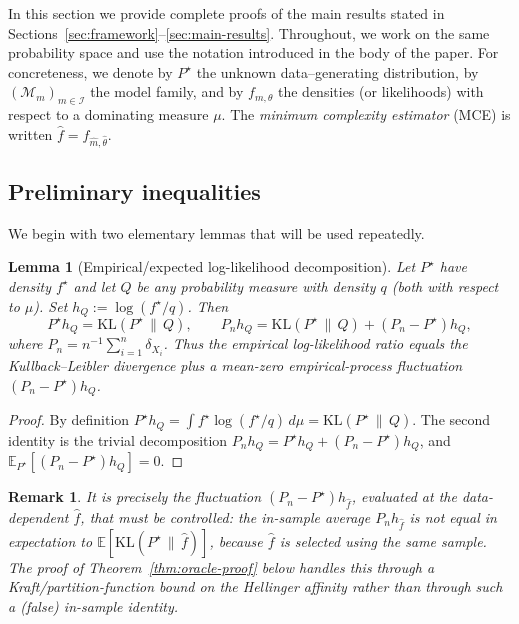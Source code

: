 \documentclass[12pt]{article}
\newtheorem{lemma}[theorem]{Lemma}
\newtheorem{remark}[theorem]{Remark}
\numberwithin{equation}{section}
\begin{document}
	In this section we provide complete proofs of the main results stated in
	Sections~\ref{sec:framework}--\ref{sec:main-results}.  Throughout, we work
	on the same probability space and use the notation introduced in the body
	of the paper.  For concreteness, we denote by $P^{\star}$ the unknown
	data--generating distribution, by $(\mathcal{M}_m)_{m\in\mathcal{I}}$ the
	model family, and by $f_{m,\theta}$ the densities (or likelihoods) with
	respect to a dominating measure $\mu$.  The \emph{minimum complexity
		estimator} (MCE) is written $\widehat{f} = f_{\widehat{m},\widehat{\theta}}$.
	
	\subsection{Preliminary inequalities}
	
	We begin with two elementary lemmas that will be used repeatedly.
	
	\begin{lemma}[Empirical/expected log-likelihood decomposition]
		\label{lem:KL-decomp}
		Let $P^{\star}$ have density $f^{\star}$ and let $Q$ be any probability
		measure with density $q$ (both with respect to $\mu$). Set
		$h_Q:=\log(f^{\star}/q)$. Then
		\begin{equation}
			P^{\star} h_Q = \mathrm{KL}(P^{\star}\,\|\,Q),
			\qquad
			P_n h_Q = \mathrm{KL}(P^{\star}\,\|\,Q) + (P_n-P^{\star})h_Q,
		\end{equation}
		where $P_n=n^{-1}\sum_{i=1}^n\delta_{X_i}$. Thus the empirical
		log-likelihood ratio equals the Kullback--Leibler divergence plus a
		mean-zero empirical-process fluctuation $(P_n-P^{\star})h_Q$.
	\end{lemma}

	\begin{proof}
		By definition $P^{\star}h_Q=\int f^{\star}\log(f^{\star}/q)\,d\mu
		=\mathrm{KL}(P^{\star}\,\|\,Q)$. The second identity is the trivial
		decomposition $P_n h_Q = P^{\star}h_Q + (P_n-P^{\star})h_Q$, and
		$\mathbb{E}_{P^{\star}}[(P_n-P^{\star})h_Q]=0$.
	\end{proof}

	\begin{remark}
		It is precisely the fluctuation $(P_n-P^{\star})h_{\widehat f}$, evaluated
		at the \emph{data-dependent} $\widehat f$, that must be controlled: the
		in-sample average $P_n h_{\widehat f}$ is \emph{not} equal in expectation
		to $\mathbb{E}[\mathrm{KL}(P^{\star}\,\|\,\widehat f)]$, because $\widehat f$
		is selected using the same sample. The proof of Theorem~\ref{thm:oracle-proof}
		below handles this through a Kraft/partition-function bound on the
		Hellinger affinity rather than through such a (false) in-sample
		identity.
	\end{remark}
	
\end{document}
